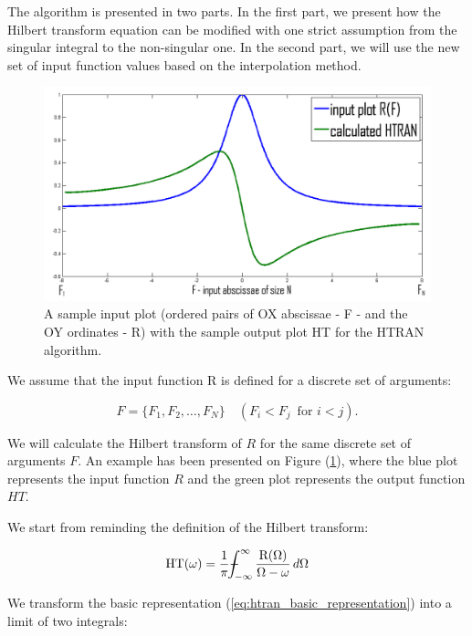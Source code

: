 \documentclass[12pt,twoside,a4paper]{article}
\numberwithin{equation}{subsection}
\numberwithin{figure}{subsection}
\def\Xint#1{\mathchoice
{\XXint\displaystyle\textstyle{#1}}%
{\XXint\textstyle\scriptstyle{#1}}%
{\XXint\scriptstyle\scriptscriptstyle{#1}}%
{\XXint\scriptscriptstyle\scriptscriptstyle{#1}}%
\!\int}
\def\XXint#1#2#3{{\setbox0=\hbox{$#1{#2#3}{\int}$ }\vcenter{\hbox{$#2#3$ }}\kern-.6\wd0}}
\def\dashint{\Xint-}
\begin{document}
The algorithm is presented in two parts. In the first part, we present how the Hilbert transform equation can be modified with one strict
assumption from the singular integral to the non-singular one. In the second part, we will use the new set of input function
values based on the interpolation method.

\begin{figure}
	\includegraphics[width=150mm]{img/htran_illustration.png}
	\caption{A sample input plot (ordered pairs of OX abscissae - F - and the OY ordinates - R) with the sample output plot HT for the HTRAN
	algorithm. \label{fig:htran_illustration}} 
\end{figure}

We assume that the input function R is defined for a discrete set of arguments:
 
\begin{equation} \label{eq:htran_arguments}
	F = \{ F_1, F_2, \ldots, F_N \} \quad (F_i < F_j \, \text{ for } i < j) . 
\end{equation}

We will calculate the Hilbert transform of $R$ for the same discrete set of arguments $F$. An example has been presented on Figure
(\ref{fig:htran_illustration}), where the blue plot represents the input function $R$ and the green plot represents the output function $HT$.


We start from reminding the definition of the Hilbert transform:

\begin{equation} \label{eq:htran_basic_representation}
 \mathrm{HT}(\omega )
  = \frac{1}{\pi } {\dashint_{ - \infty }^{\infty }  \frac {\mathrm{R}(\Omega )}{\Omega - \omega }\,d\Omega }
\end{equation}

We transform the basic representation (\ref{eq:htran_basic_representation}) into a limit of two integrals:
\end{document}
